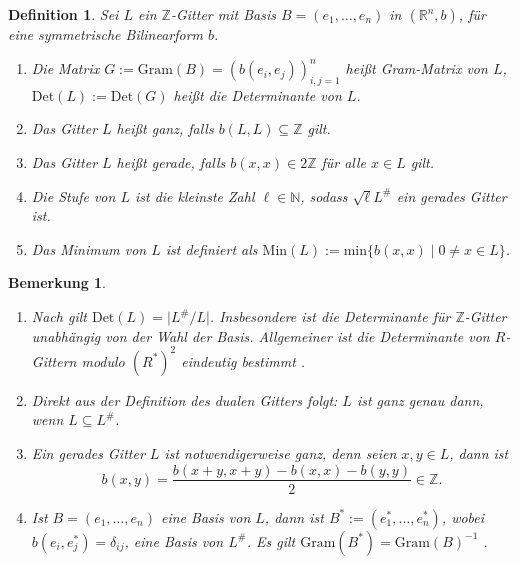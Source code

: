 \documentclass[12pt,a4paper,halfparskip,headsepline,bibtotocnumbered]{scrreprt}
\theoremstyle{nummermitklammern}
\newtheorem{definition}[defsatzusw]{Definition}
\newtheorem{bemerkung}[defsatzusw]{Bemerkung}
\theoremstyle{nonumberbreak}
\newcommand{\N}{\mathbb{N}}
\newcommand{\Z}{\mathbb{Z}}
\newcommand{\R}{\mathbb{R}}
\newcommand{\Det}{\text{Det}}
\newcommand{\Min}{\text{Min}}
\begin{document}
\begin{framed}
	\begin{definition}
		Sei $L$ ein $\Z$-Gitter mit Basis $B = (e_1, \dots, e_n)$ in $(\R^n, b)$, für eine symmetrische Bilinearform $b$.
		\begin{enumerate}[label=(\roman*)]
			\item Die Matrix $G := \text{Gram}(B) = \left(b(e_i, e_j)\right)_{i,j=1}^n$ heißt \textit{Gram-Matrix} von $L$, $\Det(L) := \Det(G)$ heißt die \textit{Determinante} von $L$.
			\item Das Gitter $L$ heißt \textit{ganz}, falls $b(L,L) \subseteq \Z$ gilt.
			\item Das Gitter $L$ heißt \textit{gerade}, falls $b(x,x) \in 2\Z$ für alle $x \in L$ gilt.
			\item Die \textit{Stufe} von $L$ ist die kleinste Zahl $\ell \in \N$, sodass $\sqrt{\ell} L^\#$ ein gerades Gitter ist.
			\item Das \textit{Minimum} von $L$ ist definiert als $\Min(L) := \text{min} \lbrace b(x,x) \mid 0 \neq x \in L \rbrace$.
		\end{enumerate}
	\end{definition}
\end{framed}


\begin{bemerkung}\label{bem:dual}
	\begin{enumerate}[label=(\roman*)]
	\item Nach \cite[Satz (14.7)]{kneser} gilt $\Det(L) = \vert L^\# / L \vert$. 
		Insbesondere ist die Determinante für $\Z$-Gitter unabhängig von der Wahl der Basis. Allgemeiner ist die Determinante von $R$-Gittern modulo $\left( R^\ast \right) ^2$ eindeutig bestimmt \cite[(1.13)]{kneser}.
	\item Direkt aus der Definition des dualen Gitters folgt: $L$ ist ganz genau dann, wenn $L \subseteq L^\#$.
	\item Ein gerades Gitter $L$ ist notwendigerweise ganz, denn seien $x,y \in L$, dann ist
		\begin{equation*}
			b(x,y) = \frac{b(x+y,x+y) - b(x,x) - b(y,y)}{2} \in \Z.
		\end{equation*}
	\item Ist $B = (e_1,\dots,e_n)$ eine Basis von $L$, dann ist $B^\ast := (e_1^\ast, \dots, e_n^\ast)$, wobei $b(e_i, e_j^\ast) = \delta_{ij}$, eine Basis von $L^\#$. Es gilt $\text{Gram}(B^\ast) = \text{Gram}(B)^{-1}$ \cite[(1.14)]{kneser}.
	\end{enumerate}
\end{bemerkung}
\end{document}
